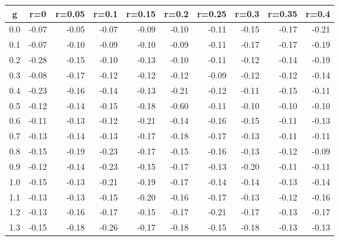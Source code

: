 %
\begin{table}[!tbp]
 \begin{center}
 \begin{tabular}{rrrrrrrrrr}\hline\hline
\multicolumn{1}{c}{g}&\multicolumn{1}{c}{r=0}&\multicolumn{1}{c}{r=0.05}&\multicolumn{1}{c}{r=0.1}&\multicolumn{1}{c}{r=0.15}&\multicolumn{1}{c}{r=0.2}&\multicolumn{1}{c}{r=0.25}&\multicolumn{1}{c}{r=0.3}&\multicolumn{1}{c}{r=0.35}&\multicolumn{1}{c}{r=0.4}\tabularnewline
\hline
0.0&-0.07&-0.05&-0.07&-0.09&-0.10&-0.11&-0.15&-0.17&-0.21\tabularnewline
0.1&-0.07&-0.10&-0.09&-0.10&-0.09&-0.11&-0.17&-0.17&-0.19\tabularnewline
0.2&-0.28&-0.15&-0.10&-0.13&-0.10&-0.11&-0.12&-0.14&-0.19\tabularnewline
0.3&-0.08&-0.17&-0.12&-0.12&-0.12&-0.09&-0.12&-0.12&-0.14\tabularnewline
0.4&-0.23&-0.16&-0.14&-0.13&-0.21&-0.12&-0.11&-0.15&-0.11\tabularnewline
0.5&-0.12&-0.14&-0.15&-0.18&-0.60&-0.11&-0.10&-0.10&-0.10\tabularnewline
0.6&-0.11&-0.13&-0.12&-0.21&-0.14&-0.16&-0.15&-0.11&-0.13\tabularnewline
0.7&-0.13&-0.14&-0.13&-0.17&-0.18&-0.17&-0.13&-0.11&-0.11\tabularnewline
0.8&-0.15&-0.19&-0.23&-0.17&-0.15&-0.16&-0.13&-0.12&-0.09\tabularnewline
0.9&-0.12&-0.14&-0.23&-0.15&-0.17&-0.13&-0.20&-0.11&-0.11\tabularnewline
1.0&-0.15&-0.13&-0.21&-0.19&-0.17&-0.14&-0.14&-0.13&-0.14\tabularnewline
1.1&-0.13&-0.13&-0.15&-0.20&-0.16&-0.17&-0.13&-0.12&-0.16\tabularnewline
1.2&-0.13&-0.16&-0.17&-0.15&-0.17&-0.21&-0.17&-0.13&-0.17\tabularnewline
1.3&-0.15&-0.18&-0.26&-0.17&-0.18&-0.15&-0.18&-0.13&-0.13\tabularnewline
\hline
\end{tabular}

\end{center}

\end{table}

